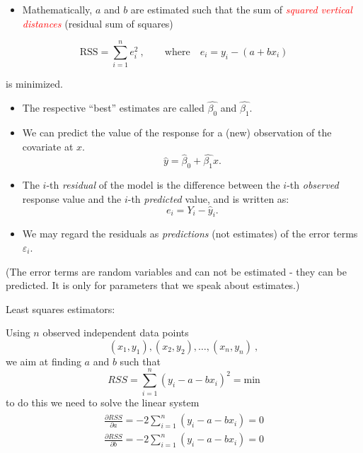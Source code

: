 \documentclass[
  10pt,
  ignorenonframetext,
]{beamer}
\providecommand{\tightlist}{%
  \setlength{\itemsep}{0pt}\setlength{\parskip}{0pt}}
\begin{document}
\begin{frame}
\begin{itemize}
\tightlist
\item
  Mathematically, \(a\) and \(b\) are estimated such that the sum of
  \emph{\textcolor{red}{squared vertical distances}} (residual sum of
  squares)
\end{itemize}

\[\text{RSS} = \sum_{i=1}^n e_i^2 \ , \qquad \text{where} \quad e_i = y_i - (a + b x_i) \]

is minimized.

\begin{itemize}
\item
  The respective ``best'' estimates are called \(\hat{\beta_0}\) and
  \(\hat{\beta_1}\).
\item
  We can predict the value of the response for a (new) observation of
  the covariate at \(x\). \[\hat{y} = \hat{\beta}_0 + \hat{\beta_1}x.\]
\item
  The \(i\)-th \emph{residual} of the model is the difference between
  the \(i\)-th \emph{observed} response value and the \(i\)-th
  \emph{predicted} value, and is written as: \[e_i = Y_i - \hat{y}_i.\]
\item
  We may regard the residuals as \emph{predictions} (not estimates) of
  the error terms \(\varepsilon_i\).
\end{itemize}

\tiny

(The error terms are random variables and can not be estimated - they
can be predicted. It is only for parameters that we speak about
estimates.)
\end{frame}

\begin{frame}
\begin{block}{Least squares estimators:}
\protect\hypertarget{least-squares-estimators}{}
\vspace{2mm}

Using \(n\) observed independent data points
\[(x_1,y_1), (x_2,y_2), \ldots, (x_n,y_n)\ ,\] we aim at finding \(a\)
and \(b\) such that \[
RSS = \sum_{i = 1}^n(y_i-a-b x_i)^2 = \text{min}
\] to do this we need to solve the linear system \begin{align}
\begin{aligned}
\frac{\partial RSS}{\partial a } =  -2 \sum_{i = 1}^n(y_i-a-b x_i) = 0\\
\frac{\partial RSS}{\partial b } =  -2 \sum_{i = 1}^n(y_i-a-b x_i) = 0\\
\end{aligned}
\end{align}
\end{block}
\end{frame}
\end{document}
